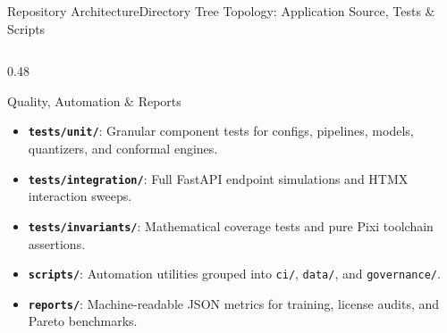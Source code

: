 \begin{frame}{Repository Architecture}{Directory Tree Topology: Application Source, Tests \& Scripts}
\begin{columns}[T]
        \begin{column}{0.48\textwidth}
            \begin{block}{Quality, Automation \& Reports}
                \begin{itemize}\scriptsize
                    \item \textbf{\texttt{tests/unit/}}: Granular component tests for configs, pipelines, models, quantizers, and conformal engines.
                    \item \textbf{\texttt{tests/integration/}}: Full FastAPI endpoint simulations and HTMX interaction sweeps.
                    \item \textbf{\texttt{tests/invariants/}}: Mathematical coverage tests and pure Pixi toolchain assertions.
                    \item \textbf{\texttt{scripts/}}: Automation utilities grouped into \texttt{ci/}, \texttt{data/}, and \texttt{governance/}.
                    \item \textbf{\texttt{reports/}}: Machine-readable JSON metrics for training, license audits, and Pareto benchmarks.
                \end{itemize}
            \end{block}
        \end{column}
    \end{columns}

\end{frame}

